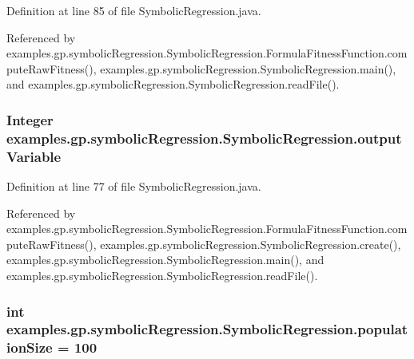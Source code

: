Definition at line 85 of file Symbolic\-Regression.\-java.



Referenced by examples.\-gp.\-symbolic\-Regression.\-Symbolic\-Regression.\-Formula\-Fitness\-Function.\-compute\-Raw\-Fitness(), examples.\-gp.\-symbolic\-Regression.\-Symbolic\-Regression.\-main(), and examples.\-gp.\-symbolic\-Regression.\-Symbolic\-Regression.\-read\-File().

\hypertarget{classexamples_1_1gp_1_1symbolic_regression_1_1_symbolic_regression_a41a52e03f6aaf7e0317f9f2fb14525b7}{
\subsubsection[{output\-Variable}]{\setlength{\rightskip}{0pt plus 5cm}Integer examples.\-gp.\-symbolic\-Regression.\-Symbolic\-Regression.\-output\-Variable\hspace{0.3cm}{\ttfamily [static]}}}\label{classexamples_1_1gp_1_1symbolic_regression_1_1_symbolic_regression_a41a52e03f6aaf7e0317f9f2fb14525b7}


Definition at line 77 of file Symbolic\-Regression.\-java.



Referenced by examples.\-gp.\-symbolic\-Regression.\-Symbolic\-Regression.\-Formula\-Fitness\-Function.\-compute\-Raw\-Fitness(), examples.\-gp.\-symbolic\-Regression.\-Symbolic\-Regression.\-create(), examples.\-gp.\-symbolic\-Regression.\-Symbolic\-Regression.\-main(), and examples.\-gp.\-symbolic\-Regression.\-Symbolic\-Regression.\-read\-File().

\hypertarget{classexamples_1_1gp_1_1symbolic_regression_1_1_symbolic_regression_af835d7ddd8022c27dd9ad767bf2e4acd}{
\subsubsection[{population\-Size}]{\setlength{\rightskip}{0pt plus 5cm}int examples.\-gp.\-symbolic\-Regression.\-Symbolic\-Regression.\-population\-Size = 100\hspace{0.3cm}{\ttfamily [static]}}}\label{classexamples_1_1gp_1_1symbolic_regression_1_1_symbolic_regression_af835d7ddd8022c27dd9ad767bf2e4acd}


